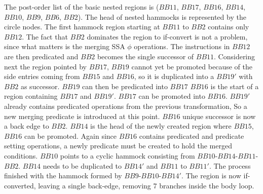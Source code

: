  The post-order list of the basic nested regions is ($BB11$, $BB17$, $BB16$, $BB14$, $BB10$, $BB9$, $BB6$, $BB2$). The head of nested hammocks is represented by the circle nodes.
The first hammock region starting at $BB11$ to $BB2$ contains only $BB12$. The fact that $BB2$ dominates the region to if-convert is not a problem, since what matters is the merging SSA $\phi$ operations. The instructions in $BB12$ are then predicated and $BB2$ becomes the single successor of $BB11$. 
Considering next the region pointed by $BB17$, $BB19$ cannot yet be promoted because of the side entries coming from $BB15$ and $BB16$, so it is duplicated into a $BB19'$ with $BB2$ as successor. $BB19$ can then be predicated into $BB17$
$BB16$ is the start of a region containing $BB17$ and $BB19'$. $BB17$ can be promoted into $BB16$. $BB19'$ already contains predicated operations from the previous transformation, So a new merging predicate is introduced at this point. $BB16$ unique successor is now a back edge to $BB2$.
$BB14$ is the head of the newly created region where $BB15$, $BB16$ can be promoted. Again since $BB16$ contains predicated and predicate setting operations, a newly predicate must be created to hold the merged conditions.
$BB10$ points to a cyclic hammock consisting from $BB10$-$BB14$-$BB11$-$BB2$. $BB14$ needs to be duplicated to $BB14'$ and $BB11$ to $BB11'$. The process finished with the hammock formed by $BB9$-$BB10$-$BB14'$.
The region is now if-converted, leaving a single back-edge, removing 7 branches inside the body loop.

